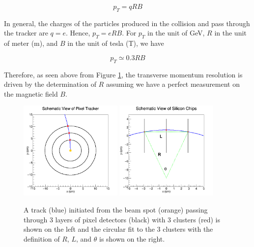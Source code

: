 \begin{equation}
p_T  = qRB
\end{equation}

In general, the charges of the particles produced in the collision and pass through the tracker are $q = e$. Hence, $p_T = eRB$. For $p_T$ in the unit of GeV, $R$ in the unit of meter (m), and $B$ in the unit of tesla (T), we have 

\begin{equation}
p_T  \simeq 0.3 RB
\end{equation}

Therefore, as seen above from Figure \ref{HelixAndFit}, the transverse momentum resolution is driven by the determination of $R$ assuming we have a perfect measurement on the magnetic field $B$.

\begin{figure}[hbtp]
\begin{center}
\includegraphics[width=0.45\textwidth]{Figures/Chapter4/PixLayTrk.png}
\includegraphics[width=0.45\textwidth]{Figures/Chapter4/FitOnHits.png}
\caption{A track (blue) initiated from the beam spot (orange) passing through 3 layers of pixel detectors (black) with 3 clusters (red) is shown on the left and the circular fit to the 3 clusters with the definition of $R$, $L$, and $\theta$ is shown on the right.}
\label{HelixAndFit}
\end{center}
\end{figure} 




